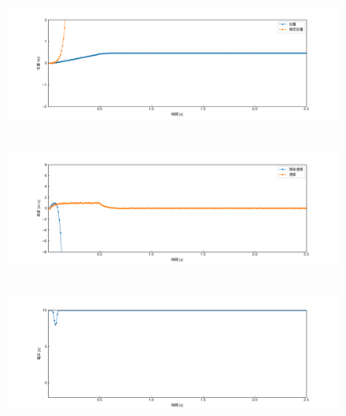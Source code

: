 \documentclass[12pt]{jsarticle}
\begin{document}
\begin{figure}[H]
  \begin{center}
    \includegraphics[clip,width=13.0cm, height=4.4cm]{../img/Exp9-1.png}
    \caption{}
    \label{Exp9-1}
  \end{center}
\end{figure}
\begin{figure}[H]
  \begin{center}
    \includegraphics[clip,width=13.0cm, height=4.4cm]{../img/Exp9-2.png}
    \caption{}
    \label{Exp9-2}
  \end{center}
\end{figure}
\begin{figure}[H]
  \begin{center}
    \includegraphics[clip,width=13.0cm, height=4.4cm]{../img/Exp9-3.png}
    \caption{}
    \label{Exp9-3}
  \end{center}
\end{figure}
\end{document}
